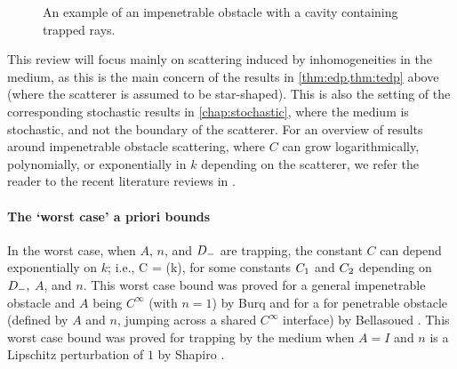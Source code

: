 \begin{figure}
\centering
\begin{tikzpicture}[scale=2]

\end{tikzpicture}
\caption{An example of an impenetrable obstacle with a cavity containing trapped rays.}\label{fig:trapping}
\end{figure}


This review will focus mainly on scattering induced by inhomogeneities in the medium, as this is the main concern of the results in \cref{thm:edp,thm:tedp} above (where the scatterer is assumed to be star-shaped). This is also the setting of the corresponding stochastic results in \cref{chap:stochastic}, where the medium is stochastic, and not the boundary of the scatterer. For an overview of results around impenetrable obstacle scattering, where $C$ can grow logarithmically, polynomially, or exponentially in $k$ depending on the scatterer, we refer the reader to the recent literature reviews in \cite[Sections 1.1 and 1.3]{ChSpGiSm:17}. %

\paragraph{The `worst case' a priori bounds} In the worst case, when $A$, $n$, and $\Dm$ are trapping, the constant $C$ can depend exponentially on $k$; i.e.,
\beq\label{eq:expbound}
C = \Co \exp(k\Ct),
\eeq
for some constants $\Co$ and $\Ct$ depending on $\Dm, $ $A$, and $n$. This worst case bound was proved for a general impenetrable obstacle and $A$ being $C^\infty$  (with $n=1$) by Burq \cite{Bu:98} and for a for penetrable obstacle (defined by $A$ and $n$, jumping across a shared $C^\infty$ interface) by  Bellasoued \cite{Be:03}. This worst case bound was proved for trapping by the medium when $A=I$ and $n$ is a Lipschitz perturbation of $1$ by Shapiro \cite{Sh:18}.%

